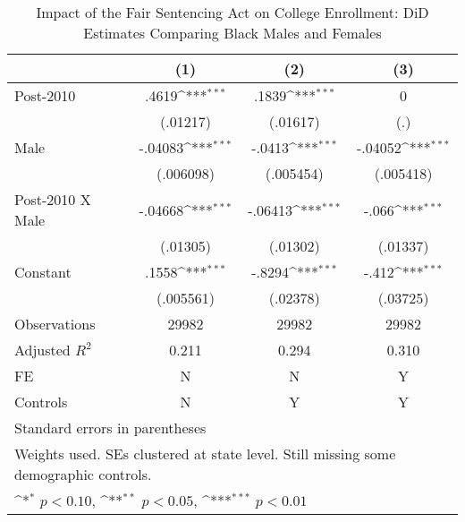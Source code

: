 \begin{table}[htbp]\centering
\def\sym#1{\ifmmode^{#1}\else\(^{#1}\)\fi}
\caption{Impact of the Fair Sentencing Act on College Enrollment: DiD Estimates Comparing Black Males and Females}
\begin{tabular}{l*{3}{c}}
\hline\hline
                    &\multicolumn{1}{c}{(1)}         &\multicolumn{1}{c}{(2)}         &\multicolumn{1}{c}{(3)}         \\
\hline
Post-2010           &       .4619\sym{***}&       .1839\sym{***}&           0         \\
                    &    (.01217)         &    (.01617)         &         (.)         \\
[1em]
Male                &     -.04083\sym{***}&      -.0413\sym{***}&     -.04052\sym{***}\\
                    &   (.006098)         &   (.005454)         &   (.005418)         \\
[1em]
Post-2010 X Male    &     -.04668\sym{***}&     -.06413\sym{***}&       -.066\sym{***}\\
                    &    (.01305)         &    (.01302)         &    (.01337)         \\
[1em]
Constant            &       .1558\sym{***}&      -.8294\sym{***}&       -.412\sym{***}\\
                    &   (.005561)         &    (.02378)         &    (.03725)         \\
\hline
Observations        &       29982         &       29982         &       29982         \\
Adjusted \(R^{2}\)  &       0.211         &       0.294         &       0.310         \\
FE                  &           N         &           N         &           Y         \\
Controls            &           N         &           Y         &           Y         \\
\hline\hline
\multicolumn{4}{l}{\footnotesize Standard errors in parentheses}\\
\multicolumn{4}{l}{\footnotesize Weights used. SEs clustered at state level. Still missing some demographic controls.}\\
\multicolumn{4}{l}{\footnotesize \sym{*} \(p<0.10\), \sym{**} \(p<0.05\), \sym{***} \(p<0.01\)}\\
\end{tabular}
\end{table}
